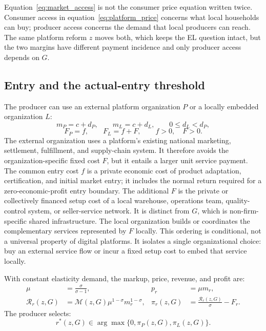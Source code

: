 \documentclass[11pt]{article}
\theoremstyle{definition}
\theoremstyle{remark}
\newcommand{\Mcal}{\mathcal M}
\newcommand{\Rcal}{\mathcal R}
\begin{document}
Equation~\eqref{eq:market_access} is not the consumer price equation written
twice.  Consumer access in equation~\eqref{eq:platform_price} concerns what
local households can buy; producer access concerns the demand that local
producers can reach.  The same platform reform \(z\) moves both, which keeps
the EL question intact, but the two margins have different payment incidence
and only producer access depends on \(G\).

\subsection{Entry and the actual-entry threshold}

The producer can use an external platform organization \(P\) or a locally
embedded organization \(L\):
\begin{equation}
 m_P=c+d_P,\qquad
 m_L=c+d_L,\qquad
 0\leq d_L<d_P,
 \label{eq:marginal_costs}
\end{equation}
\begin{equation}
 F_P=f,\qquad F_L=f+F,\qquad f>0,\quad F>0.
 \label{eq:fixed_costs}
\end{equation}
The external organization uses a platform's existing national marketing,
settlement, fulfillment, and supply-chain system.  It therefore avoids the
organization-specific fixed cost \(F\), but it entails a larger unit service
payment.  The common entry cost \(f\) is a private economic cost of product
adaptation, certification, and initial market entry; it includes the normal
return required for a zero-economic-profit entry boundary.  The additional
\(F\) is the private or
collectively financed setup cost of a local warehouse, operations team,
quality-control system, or seller-service network.  It is distinct from
\(G\), which is non-firm-specific shared infrastructure.  The local
organization builds or coordinates the complementary services represented by
\(F\) locally.  This ordering is conditional, not a universal property of
digital platforms.  It isolates a single organizational choice: buy an
external service flow or incur a fixed setup cost to embed that service
locally.

With constant elasticity demand, the markup, price, revenue, and profit are:
\begin{align}
 \mu&=\frac{\sigma}{\sigma-1},&
 p_r&=\mu m_r,
 \label{eq:markup}\\
 \Rcal_r(z,G)
 &=\Mcal(z,G)\mu^{1-\sigma}m_r^{1-\sigma},&
 \pi_r(z,G)
 &=\frac{\Rcal_r(z,G)}{\sigma}-F_r.
 \label{eq:revenue_profit}
\end{align}
The producer selects:
\begin{equation}
 r^*(z,G)\in\arg\max\{0,\pi_P(z,G),\pi_L(z,G)\}.
 \label{eq:producer_choice}
\end{equation}
\end{document}
